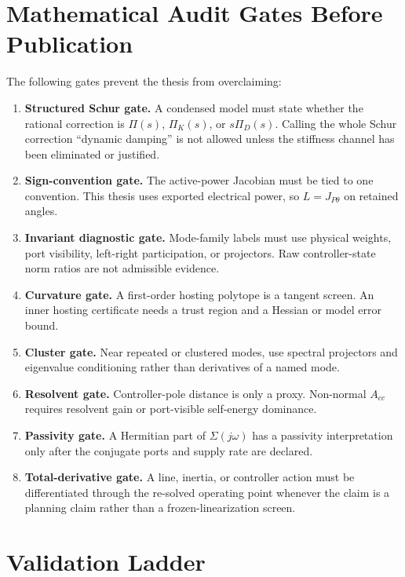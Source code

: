 \section{Mathematical Audit Gates Before Publication}

The following gates prevent the thesis from overclaiming:
\begin{enumerate}
\item \textbf{Structured Schur gate.} A condensed model must state whether the
rational correction is \(\Pi(s)\), \(\Pi_K(s)\), or \(s\Pi_D(s)\). Calling the
whole Schur correction ``dynamic damping'' is not allowed unless the stiffness
channel has been eliminated or justified.
\item \textbf{Sign-convention gate.} The active-power Jacobian must be tied to
one convention. This thesis uses exported electrical power, so \(L=J_{P\theta}\)
on retained angles.
\item \textbf{Invariant diagnostic gate.} Mode-family labels must use physical
weights, port visibility, left-right participation, or projectors. Raw
controller-state norm ratios are not admissible evidence.
\item \textbf{Curvature gate.} A first-order hosting polytope is a tangent
screen. An inner hosting certificate needs a trust region and a Hessian or model
error bound.
\item \textbf{Cluster gate.} Near repeated or clustered modes, use spectral
projectors and eigenvalue conditioning rather than derivatives of a named mode.
\item \textbf{Resolvent gate.} Controller-pole distance is only a proxy.
Non-normal \(A_{cc}\) requires resolvent gain or port-visible self-energy
dominance.
\item \textbf{Passivity gate.} A Hermitian part of \(\Sigma(j\omega)\) has a
passivity interpretation only after the conjugate ports and supply rate are
declared.
\item \textbf{Total-derivative gate.} A line, inertia, or controller action must
be differentiated through the re-solved operating point whenever the claim is a
planning claim rather than a frozen-linearization screen.
\end{enumerate}

\section{Validation Ladder}

